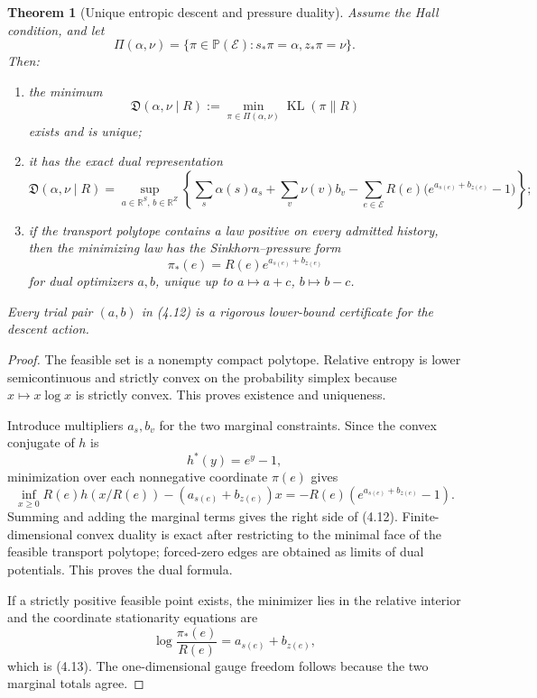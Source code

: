 \documentclass[11pt]{article}
\newtheorem{theorem}{Theorem}[section]
\theoremstyle{definition}
\theoremstyle{remark}
\newcommand{\R}{\mathbb R}
\newcommand{\Prob}{\mathbb P}
\newcommand{\KL}{\operatorname{KL}}
\begin{document}
\begin{theorem}[Unique entropic descent and pressure duality]
\label{thm:entropic-dual}
Assume the Hall condition, and let
\[
 \Pi(\alpha,\nu)
 =\{\pi\in\Prob(\mathcal E):s_*\pi=\alpha,
                                  z_*\pi=\nu\}.
\]
Then:
\begin{enumerate}[label=\textup{(E\arabic*)},leftmargin=3em]
\item the minimum
      \[
       \mathfrak D(\alpha,\nu\mid R)
       :=\min_{\pi\in\Pi(\alpha,\nu)}\KL(\pi\|R)
      \]
      exists and is unique;
\item it has the exact dual representation
      \[
       \boxed{
       \mathfrak D(\alpha,\nu\mid R)
       =\sup_{a\in\R^S,\,b\in\R^Z}
       \left\{
        \sum_s\alpha(s)a_s+\sum_v\nu(v)b_v
        -\sum_{e\in\mathcal E}R(e)
         \bigl(e^{a_{s(e)}+b_{z(e)}}-1\bigr)
       \right\};}
       \tag{4.12}
      \]
\item if the transport polytope contains a law positive on every admitted
      history, then the minimizing law has the Sinkhorn--pressure form
      \[
       \boxed{
       \pi_*(e)=R(e)e^{a_{s(e)}+b_{z(e)}}}
       \tag{4.13}
      \]
      for dual optimizers $a,b$, unique up to
      $a\mapsto a+c$, $b\mapsto b-c$.
\end{enumerate}
Every trial pair $(a,b)$ in \textup{(4.12)} is a rigorous lower-bound
certificate for the descent action.
\end{theorem}

\begin{proof}
The feasible set is a nonempty compact polytope.  Relative entropy is lower
semicontinuous and strictly convex on the probability simplex because
$x\mapsto x\log x$ is strictly convex.  This proves existence and uniqueness.

Introduce multipliers $a_s,b_v$ for the two marginal constraints.  Since the
convex conjugate of $h$ is
\[
 h^*(y)=e^y-1,
\]
minimization over each nonnegative coordinate $\pi(e)$ gives
\[
 \inf_{x\ge0}R(e)h(x/R(e))-(a_{s(e)}+b_{z(e)})x
 =-R(e)(e^{a_{s(e)}+b_{z(e)}}-1).
\]
Summing and adding the marginal terms gives the right side of
\textup{(4.12)}.  Finite-dimensional convex duality is exact after restricting
to the minimal face of the feasible transport polytope; forced-zero edges are
obtained as limits of dual potentials.  This proves the dual formula.

If a strictly positive feasible point exists, the minimizer lies in the
relative interior and the coordinate stationarity equations are
\[
 \log\frac{\pi_*(e)}{R(e)}=a_{s(e)}+b_{z(e)},
\]
which is \textup{(4.13)}.  The one-dimensional gauge freedom follows because
the two marginal totals agree.
\end{proof}
\end{document}
